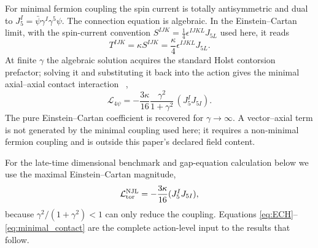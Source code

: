\documentclass[aps,prd,twocolumn,superscriptaddress,showpacs,preprintnumbers,nofootinbib,longbibliography,floatfix]{revtex4-2}
\begin{document}
For minimal fermion coupling the spin current is totally antisymmetric and
dual to $J_5^I=\bar\psi\gamma^I\gamma^5\psi$.  The connection equation is
algebraic.  In the Einstein--Cartan limit, with the spin-current convention
$S^{IJK}=\tfrac14\epsilon^{IJKL}J_{5L}$ used here, it reads
\begin{equation}\label{eq:torsion}
T^{IJK}=\kappa S^{IJK}=\frac{\kappa}{4}\epsilon^{IJKL}J_{5L}.
\end{equation}
At finite $\gamma$ the algebraic solution acquires the standard Holst
contorsion prefactor; solving it and substituting it back into the action gives
the minimal axial--axial contact interaction
~\cite{Freidel2005,Mercuri2009},
\begin{equation}\label{eq:4fermi}
\mathcal L_{4\psi}=-\frac{3\kappa}{16}
\frac{\gamma^2}{1+\gamma^2}\,(J_5^I J_{5I}).
\end{equation}
The pure Einstein--Cartan coefficient is recovered for
$\gamma\rightarrow\infty$.  A vector--axial term is not generated by the
minimal coupling used here; it requires a non-minimal fermion coupling and is
outside this paper's declared field content.

For the late-time dimensional benchmark and gap-equation calculation below we use the
maximal Einstein--Cartan magnitude,
\begin{equation}\label{eq:minimal_contact}
\mathcal L^{\rm NJL}_{\rm tor}=-\frac{3\kappa}{16}(J_5^I J_{5I}),
\end{equation}
because $\gamma^2/(1+\gamma^2)<1$ can only reduce the coupling.  Equations
\eqref{eq:ECH}--\eqref{eq:minimal_contact} are the complete action-level input to
the results that follow.
\end{document}
